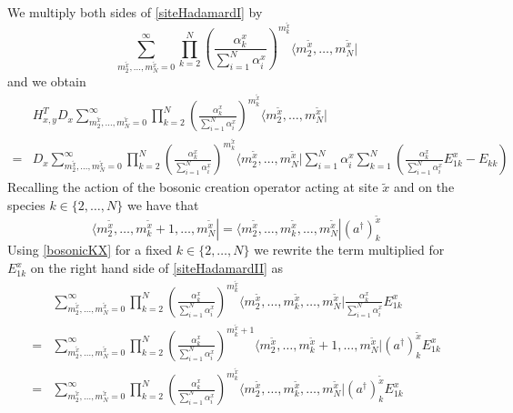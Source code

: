 \documentclass[11pt]{article}
\numberwithin{equation}{section}
\numberwithin{equation}{subsection}
\begin{document}
We multiply both sides of \eqref{siteHadamardI} by 
\begin{equation}
\sum_{m_{2}^{\widetilde{x}},\ldots,m_{N}^{\widetilde{x}}=0}^{\infty}\prod_{k=2}^{N}\left(\frac{\alpha_{k}^{x}}{\sum_{i=1}^{N}\alpha_{i}^{x}}\right)^{m_{k}^{\widetilde{x}}}\langle m_{2}^{\widetilde{x}},\ldots,m_{N}^{\widetilde{x}}|
\end{equation}
and we obtain 
\begin{equation}\label{siteHadamardII}
    \begin{split}
&H_{x,y}^{T}D_{x}\sum_{m_{2}^{\widetilde{x}},\ldots,m_{N}^{\widetilde{x}}=0}^{\infty}\prod_{k=2}^{N}\left(\frac{\alpha_{k}^{x}}{\sum_{i=1}^{N}\alpha_{i}^{x}}\right)^{m_{k}^{\widetilde{x}}}\langle m_{2}^{\widetilde{x}},\ldots,m_{N}^{\widetilde{x}}|
\\=&
D_{x}\sum_{m_{2}^{\widetilde{x}},\ldots,m_{N}^{\widetilde{x}}=0}^{\infty}\prod_{k=2}^{N}\left(\frac{\alpha_{k}^{x}}{\sum_{i=1}^{N}\alpha_{i}^{x}}\right)^{m_{k}^{\widetilde{x}}}\langle m_{2}^{\widetilde{x}},\ldots,m_{N}^{\widetilde{x}}|\sum_{i=1}^{N}\alpha_{i}^{x}\sum_{k=1}^{N}\left(\frac{\alpha_{k}^{x}}{\sum_{i=1}^{N}\alpha_{i}^{x}}E_{1k}^{x}-E_{kk}\right)
    \end{split}
\end{equation}
Recalling the action of the bosonic creation operator acting at site $\widetilde{x}$ and on the species $k\in \{2,\ldots,N\}$ we have that 
\begin{equation}\label{bosonicKX}
    \langle m_{2}^{\widetilde{x}},\ldots,m_{k}^{\widetilde{x}}+1,\ldots,m_{N}^{\widetilde{x}}|=  \langle m_{2}^{\widetilde{x}},\ldots,m_{k}^{\widetilde{x}},\ldots,m_{N}^{\widetilde{x}}|(a^{\dagger})^{\widetilde{x}}_{k}
\end{equation}
Using \eqref{bosonicKX} for a fixed $k\in \{2,\ldots,N\}$ we rewrite the term multiplied for $E_{1k}^{x}$ on the right hand side of \eqref{siteHadamardII} as 
\begin{equation}
    \begin{split}
&\sum_{m_{2}^{\widetilde{x}},\ldots,m_{N}^{\widetilde{x}}=0}^{\infty}\prod_{k=2}^{N}\left(\frac{\alpha_{k}^{x}}{\sum_{i=1}^{N}\alpha_{i}^{x}}\right)^{m_{k}^{\widetilde{x}}}\langle m_{2}^{\widetilde{x}},\ldots,m_{k}^{\widetilde{x}},\ldots,m_{N}^{\widetilde{x}}|\frac{\alpha_{k}^{x}}{\sum_{i=1}^{N}\alpha_{i}^{x}}E_{1k}^{x}
\\=&\sum_{m_{2}^{\widetilde{x}},\ldots,m_{N}^{\widetilde{x}}=0}^{\infty}\prod_{k=2}^{N}\left(\frac{\alpha_{k}^{x}}{\sum_{i=1}^{N}\alpha_{i}^{x}}\right)^{m_{k}^{\widetilde{x}}+1}\langle m_{2}^{\widetilde{x}},\ldots,m_{k}^{\widetilde{x}}+1,\ldots,m_{N}^{\widetilde{x}}|(a^{\dagger})_{k}^{\widetilde{x}}E_{1k}^{x}
\\=&
\sum_{m_{2}^{\widetilde{x}},\ldots,m_{N}^{\widetilde{x}}=0}^{\infty}\prod_{k=2}^{N}\left(\frac{\alpha_{k}^{x}}{\sum_{i=1}^{N}\alpha_{i}^{x}}\right)^{m_{k}^{\widetilde{x}}}\langle m_{2}^{\widetilde{x}},\ldots,m_{k}^{\widetilde{x}},\ldots,m_{N}^{\widetilde{x}}|(a^{\dagger})_{k}^{\widetilde{x}}E_{1k}^{x}
    \end{split}
\end{equation}
\end{document}
